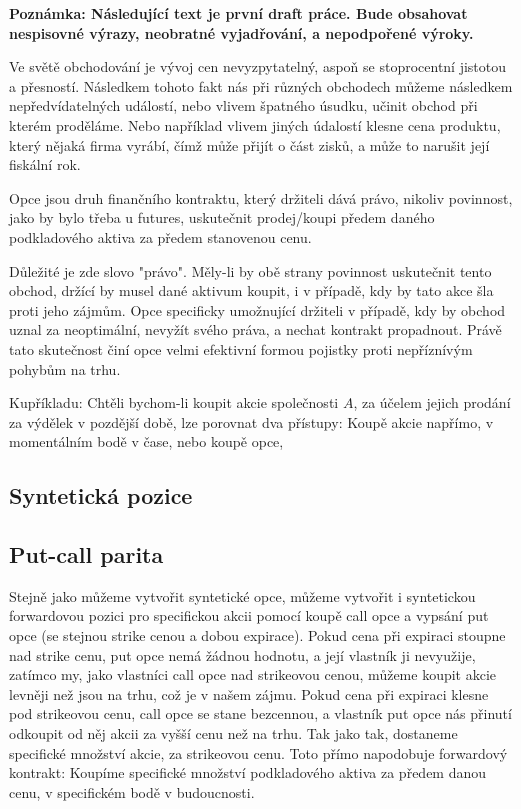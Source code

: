 \documentclass[male,czech,api_bc]{kitheses}
\begin{document}
  \textbf{Poznámka: Následující text je první draft práce. Bude obsahovat nespisovné výrazy, neobratné vyjadřování, a nepodpořené výroky.}

  Ve světě obchodování je vývoj cen nevyzpytatelný, aspoň se stoprocentní jistotou a přesností. Následkem tohoto fakt nás při různých obchodech můžeme následkem nepředvídatelných událostí, nebo vlivem špatného úsudku, učinit obchod při kterém proděláme. Nebo například vlivem jiných údalostí klesne cena produktu, který nějaká firma vyrábí, čímž může přijít o část zisků, a může to narušit její fiskální rok.

  Opce jsou druh finančního kontraktu, který držiteli dává právo, nikoliv povinnost, jako by bylo třeba u futures, uskutečnit prodej/koupi předem daného podkladového aktiva za předem stanovenou cenu.

  Důležité je zde slovo "právo". Měly-li by obě strany povinnost uskutečnit tento obchod, držící by musel dané aktivum koupit, i v případě, kdy by tato akce šla proti jeho zájmům. Opce specificky umožnující držiteli v případě, kdy by obchod uznal za neoptimální, nevyžít svého práva, a nechat kontrakt propadnout. Právě tato skutečnost činí opce velmi efektivní formou pojistky proti nepříznívým pohybům na trhu.

  Kupříkladu: Chtěli bychom-li koupit akcie společnosti $A$, za účelem jejich prodání za výdělek v pozdější době, lze porovnat dva přístupy: Koupě akcie napřímo, v momentálním bodě v čase, nebo koupě opce, 

  \subsection{Syntetická pozice}

  \subsection{Put-call parita}

  Stejně jako můžeme vytvořit syntetické opce, můžeme vytvořit i syntetickou forwardovou pozici pro specifickou akcii pomocí koupě call opce a vypsání put opce (se stejnou strike cenou a dobou expirace). Pokud cena při expiraci stoupne nad strike cenu, put opce nemá žádnou hodnotu, a její vlastník ji nevyužije, zatímco my, jako vlastníci call opce nad strikeovou cenou, můžeme koupit akcie levněji než jsou na trhu, což je v našem zájmu. Pokud cena při expiraci klesne pod strikeovou cenu, call opce se stane bezcennou, a vlastník put opce nás přinutí odkoupit od něj akcii za vyšší cenu než na trhu. Tak jako tak, dostaneme specifické množství akcie, za strikeovou cenu. Toto přímo napodobuje forwardový kontrakt: Koupíme specifické množství podkladového aktiva za předem danou cenu, v specifickém bodě v budoucnosti.
\end{document}
